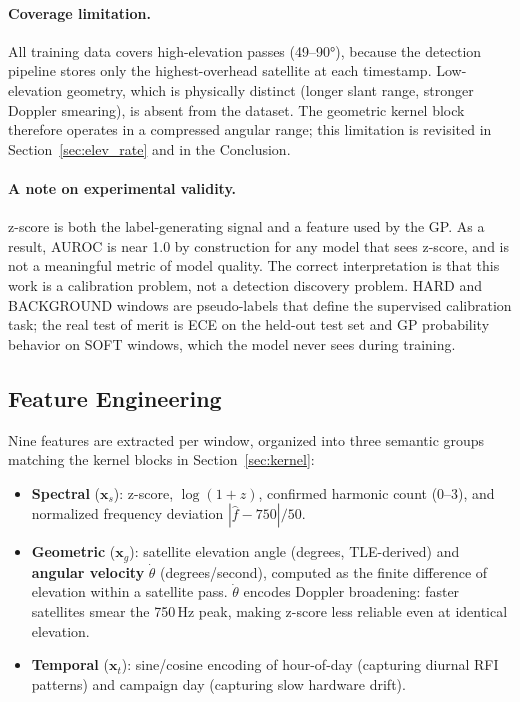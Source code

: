 \documentclass{article}
\begin{document}
\paragraph{Coverage limitation.}
All training data covers high-elevation passes (49--90°), because the detection
pipeline stores only the highest-overhead satellite at each timestamp. Low-elevation
geometry, which is physically distinct (longer slant range, stronger Doppler smearing),
is absent from the dataset. The geometric kernel block therefore operates in a
compressed angular range; this limitation is revisited in Section~\ref{sec:elev_rate}
and in the Conclusion.

\paragraph{A note on experimental validity.}
z-score is both the label-generating signal and a feature used by the GP. As a
result, AUROC is near 1.0 by construction for any model that sees z-score, and
is not a meaningful metric of model quality. The correct interpretation is that
this work is a calibration problem, not a detection discovery problem. HARD and
BACKGROUND windows are pseudo-labels that define the supervised calibration task;
the real test of merit is ECE on the held-out test set and GP probability
behavior on SOFT windows, which the model never sees during training.

\subsection{Feature Engineering}

Nine features are extracted per window, organized into three semantic groups
matching the kernel blocks in Section~\ref{sec:kernel}:

\begin{itemize}
  \item \textbf{Spectral} ($\mathbf{x}_s$): z-score, $\log(1+z)$, confirmed harmonic
        count (0--3), and normalized frequency deviation $|\hat{f}-750|/50$.
  \item \textbf{Geometric} ($\mathbf{x}_g$): satellite elevation angle (degrees,
        TLE-derived) and \textbf{angular velocity} $\dot{\theta}$ (degrees/second),
        computed as the finite difference of elevation within a satellite pass.
        $\dot{\theta}$ encodes Doppler broadening: faster satellites smear the
        750\,Hz peak, making z-score less reliable even at identical elevation.
  \item \textbf{Temporal} ($\mathbf{x}_t$): sine/cosine encoding of hour-of-day
        (capturing diurnal RFI patterns) and campaign day (capturing slow
        hardware drift).
\end{itemize}
\end{document}
